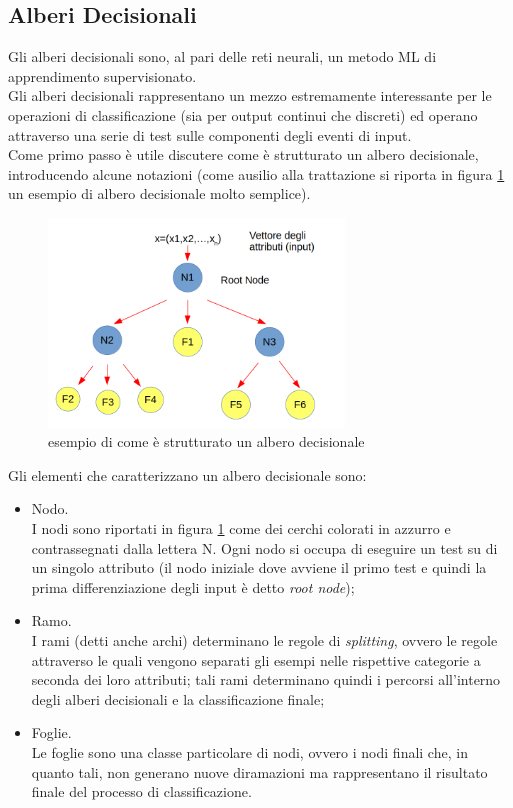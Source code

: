 
\subsection{Alberi Decisionali}
\label{alberi decisionali}
Gli alberi decisionali sono, al pari delle reti neurali, un metodo ML di apprendimento supervisionato.\\
Gli alberi decisionali rappresentano un mezzo estremamente interessante per le operazioni di classificazione (sia per output continui che discreti) ed operano attraverso una serie di test sulle componenti degli eventi di input. \\ 
Come primo passo è utile discutere come è strutturato un albero decisionale, introducendo alcune notazioni (come ausilio alla trattazione si riporta in figura \ref{schemaDT} un esempio di albero decisionale molto semplice). \\

\begin{figure} [h!]
	\centering
	\includegraphics[width=0.70\textwidth]{figs/schemaDT.png}
	\caption{esempio di come è strutturato un albero decisionale}
	\label{schemaDT}
\end{figure} 

Gli elementi che caratterizzano un albero decisionale sono:
\begin{itemize}
	\item Nodo. \\
	I nodi sono riportati in figura \ref{schemaDT} come dei cerchi colorati in azzurro e contrassegnati dalla lettera N. Ogni nodo si occupa di eseguire un test su di un singolo attributo (il nodo iniziale dove avviene il primo test e quindi la prima differenziazione degli input è detto \textit{root node});
	\item Ramo. \\
	I rami (detti anche archi) determinano le regole di \textit{splitting}, ovvero le regole attraverso le quali vengono separati gli esempi nelle rispettive categorie a seconda dei loro attributi; tali rami determinano quindi i percorsi all'interno degli alberi decisionali e la classificazione finale;
	\item Foglie. \\
	Le foglie sono una classe particolare di nodi, ovvero i nodi finali che, in quanto tali, non generano nuove diramazioni ma rappresentano il risultato finale del processo di classificazione.
\end{itemize}

